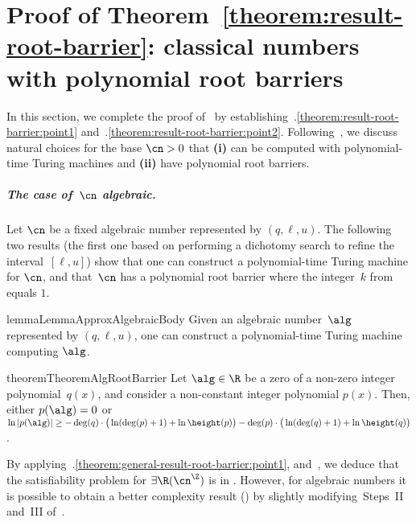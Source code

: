 \section{Proof of Theorem~\ref{theorem:result-root-barrier}: classical numbers with polynomial root barriers}\label{sec:poly-evaluation}

In this section, we complete the proof of~ by
establishing~.\ref{theorem:result-root-barrier:point1}
and~.\ref{theorem:result-root-barrier:point2}.
Following~, we discuss natural choices for the base $\cn > 0$ that \textbf{(i)} can be computed with
polynomial-time Turing machines and \textbf{(ii)} have polynomial root barriers. 


\subparagraph*{The case of~$\cn$ algebraic.} 
Let $\cn$ be a fixed algebraic number represented by $(q,\ell,u)$.
The following two results (the first one based on performing a dichotomy search 
to refine the interval~$[\ell,u]$) 
show that one can construct a polynomial-time Turing machine for $\cn$, 
and that~$\cn$ has a polynomial root barrier where the integer~$k$ from~ equals $1$.

\begin{restatable}{lemma}{LemmaApproxAlgebraicBody}
  \label{lemma:approx-algebraic-body}
  Given an algebraic number~$\alg$ represented by $(q,\ell,u)$, 
  one can construct a polynomial-time Turing machine computing $\alg$.
\end{restatable}

\vspace{-7pt}

\begin{restatable}{theorem}{TheoremAlgRootBarrier}\label{theorem:alg-root-barrier}
  Let $\alg \in \R$ be a zero
  of a non-zero integer polynomial~$q(x)$,
  and consider a non-constant integer polynomial $p(x)$.
  Then, either ${p(\alg) = 0}$ or 
  ${\ln \abs{p(\alg)} \geq - \deg(q) \cdot \big(\ln(\deg(p)+1) + \ln \height(p)\big)
  - \deg(p) \cdot \big( \ln(\deg(q)+1) + \ln \height(q) \big)}$.
\end{restatable}

By applying~.\ref{theorem:general-result-root-barrier:point1}, 
 and~, we deduce that the satisfiability problem for $\exists\R(\ipow{\cn})$ is in \twoexptime. However, for algebraic numbers it is possible to obtain a better complexity result (\expspace) by slightly modifying~Steps~II and~III of~.

